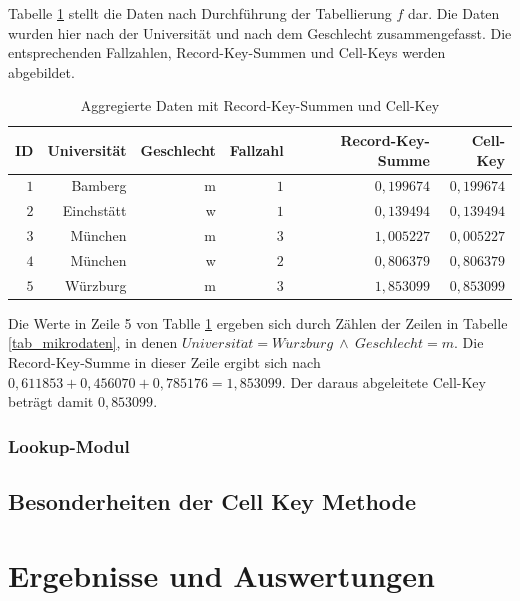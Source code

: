 Tabelle \ref{tab_agg} stellt die Daten nach Durchführung der Tabellierung $f$ dar. Die Daten wurden hier nach der Universität und nach dem Geschlecht zusammengefasst. Die entsprechenden Fallzahlen, Record-Key-Summen und Cell-Keys werden abgebildet. 

\begin{table}[h]
    \centering
    \begin{tabular}{ r r r r r r}
        \textbf{ID} \vline & \textbf{Universität} & \textbf{Geschlecht} & \textbf{Fallzahl} & \textbf{Record-Key-Summe} & \textbf{Cell-Key} \\ 
        \hline
        $1$ \vline & Bamberg & m & $1$ & $0,199674$ & $0,199674$ \\
        $2$ \vline & Einchstätt & w & $1$ & $0,139494$ & $0,139494$ \\
        $3$ \vline & München & m & $3$ & $1,005227$ & $0,005227$ \\
        $4$ \vline & München & w & $2$ & $0,806379$ & $0,806379$ \\
        $5$ \vline & Würzburg & m & $3$ & $1,853099$ & $0,853099$
    \end{tabular}
    \caption{Aggregierte Daten mit Record-Key-Summen und Cell-Key}
    \label{tab_agg}
\end{table}

Die Werte in Zeile 5 von Tablle \ref{tab_agg} ergeben sich durch Zählen der Zeilen in Tabelle \ref{tab_mikrodaten}, in denen $Universit\ddot{a}t = W\ddot{u}rzburg \: \wedge \: Geschlecht = m$. Die Record-Key-Summe in dieser Zeile ergibt sich nach $0,611853 + 0,456070 + 0,785176 = 1,853099$. Der daraus abgeleitete Cell-Key beträgt damit $0,853099$.

\subsubsection{Lookup-Modul}

\subsection{Besonderheiten der Cell Key Methode}%



\section{Ergebnisse und Auswertungen}

